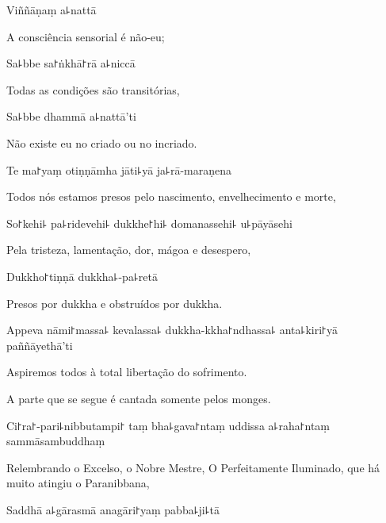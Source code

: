 Viññāṇaṃ a꜕nattā

\begin{english}
  A consciência sensorial é não-eu;
\end{english}

Sa꜕bbe sa꜓ṅkhā꜓rā a꜕niccā

\begin{english}
  Todas as condições são transitórias,
\end{english}

Sa꜕bbe dhammā a꜕nattā'ti

\begin{english}
  Não existe eu no criado ou no incriado.
\end{english}

Te ma꜓yaṃ otiṇṇāmha jāti꜕yā ja꜕rā-maraṇena

\begin{english}
  Todos nós estamos presos pelo nascimento, envelhecimento e morte,
\end{english}

So꜓kehi꜕ pa꜕ridevehi꜕ dukkhe꜓hi꜕ domanassehi꜕ u꜕pāyāsehi

\begin{english}
  Pela tristeza, lamentação, dor, mágoa e desespero,
\end{english}

Dukkho꜓tiṇṇā dukkha꜕-pa꜕retā

\begin{english}
  Presos por dukkha e obstruídos por dukkha.
\end{english}

Appeva nāmi꜓massa꜕ kevalassa꜕ dukkha-kkha꜓ndhassa꜕ anta꜕kiri꜓yā \\paññāyethā'ti

\begin{english}
  Aspiremos todos à total libertação do sofrimento.
\end{english}

\begin{instruction}
  A parte que se segue é cantada somente pelos monges.
\end{instruction}

Ci꜓ra꜓-pari꜕nibbutampi꜓ taṃ bha꜕gava꜓ntaṃ uddissa a꜕raha꜓ntaṃ sammāsambuddhaṃ

\begin{english}
  Relembrando o Excelso, o Nobre Mestre, O Perfeitamente Iluminado, que há muito atingiu o Paranibbana,
\end{english}

Saddhā a꜕gārasmā anagāri꜓yaṃ pabba꜕ji꜕tā

